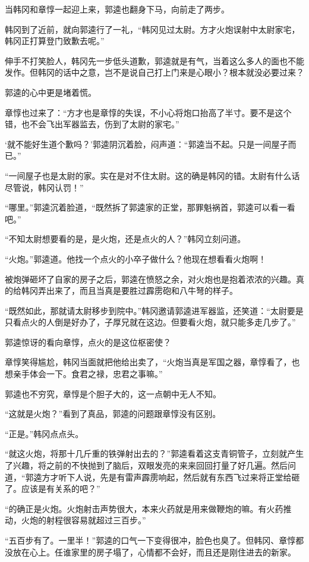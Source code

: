 当韩冈和章惇一起迎上来，郭逵也翻身下马，向前走了两步。

韩冈到了近前，就向郭逵行了一礼，“韩冈见过太尉。方才火炮误射中太尉家宅，韩冈正打算登门致歉去呢。”

伸手不打笑脸人，韩冈先一步低头道歉，郭逵就是有气，当着这么多人的面也不能发作。但韩冈的话中之意，岂不是说自己打上门来是心眼小？根本就没必要过来？

郭逵的心中更是堵着慌。

章惇也过来了：“方才也是章惇的失误，不小心将炮口抬高了半寸。要不是这个错，也不会飞出军器监去，伤到了太尉的家宅。”

‘就不能好生道个歉吗？’郭逵阴沉着脸，闷声道：“郭逵当不起。只是一间屋子而已。”

“一间屋子也是太尉的家。实在是对不住太尉。这的确是韩冈的错。太尉有什么话尽管说，韩冈认罚！”

“哪里。”郭逵沉着脸道，“既然拆了郭逵家的正堂，那罪魁祸首，郭逵可以看一看吧。”

“不知太尉想要看的是，是火炮，还是点火的人？”韩冈立刻问道。

“火炮。”郭逵道。他找一个点火的小卒子做什么？他现在想看看火炮啊！

被炮弹砸坏了自家的房子之后，郭逵在愤怒之余，对火炮也是抱着浓浓的兴趣。真的给韩冈弄出来了，而且当真是要胜过霹雳砲和八牛弩的样子。

“既然如此，那就请太尉移步到院中。”韩冈邀请郭逵进军器监，还笑道：“太尉要是只看点火的人倒是好办了，子厚兄就在这边。但要看火炮，就只能多走几步了。”

郭逵惊讶的看向章惇，点火的是这位枢密使？

章惇笑得尴尬，韩冈当面就把他给出卖了，“火炮当真是军国之器，章惇看了，也想亲手体会一下。食君之禄，忠君之事嘛。”

郭逵也不穷究，章惇是个胆子大的，这一点朝中无人不知。

“这就是火炮？”看到了真品，郭逵的问题跟章惇没有区别。

“正是。”韩冈点点头。

“就这火炮，将那十几斤重的铁弹射出去的？”郭逵看着这支青铜管子，立刻就产生了兴趣，将之前的不快抛到了脑后，双眼发亮的来来回回打量了好几遍。然后问道，“郭逵方才听下人说，先是有雷声霹雳响起，然后就有东西飞过来将正堂给砸了。应该是有关系的吧？”

“的确正是火炮。火炮射击声势很大，本来火药就是用来做鞭炮的嘛。有火药推动，火炮的射程很容易就超过三百步。”

“五百步有了。一里半！”郭逵的口气一下变得很冲，脸色也臭了。但韩冈、章惇都没放在心上。任谁家里的房子塌了，心情都不会好，而且还是刚住进去的新家。

